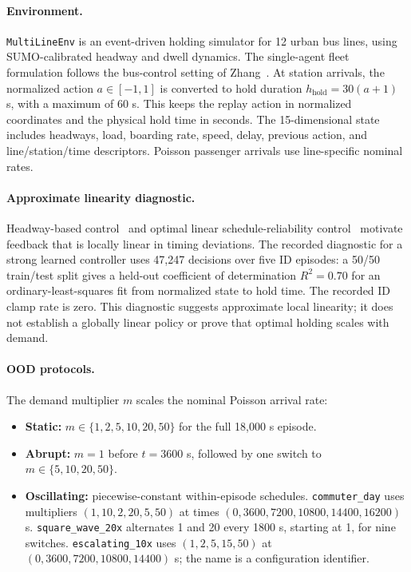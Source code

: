 \documentclass[10pt]{article}
\begin{document}
\paragraph{Environment.}
\texttt{MultiLineEnv} is an event-driven holding simulator for 12 urban bus lines, using SUMO-calibrated headway and dwell dynamics. The single-agent fleet formulation follows the bus-control setting of Zhang~\cite{Zhang2025SingleAgentBus}. At station arrivals, the normalized action $a\in[-1,1]$ is converted to hold duration $h_{\mathrm{hold}}=30(a+1)$ s, with a maximum of 60 s. This keeps the replay action in normalized coordinates and the physical hold time in seconds. The 15-dimensional state includes headways, load, boarding rate, speed, delay, previous action, and line/station/time descriptors. Poisson passenger arrivals use line-specific nominal rates.

\paragraph{Approximate linearity diagnostic.}
Headway-based control~\cite{daganzo2009headway} and optimal linear schedule-reliability control~\cite{xuan2011dynamic} motivate feedback that is locally linear in timing deviations. The recorded diagnostic for a strong learned controller uses 47,247 decisions over five ID episodes: a 50/50 train/test split gives a held-out coefficient of determination $R^2=0.70$ for an ordinary-least-squares fit from normalized state to hold time. The recorded ID clamp rate is zero. This diagnostic suggests approximate local linearity; it does not establish a globally linear policy or prove that optimal holding scales with demand.

\paragraph{OOD protocols.}
The demand multiplier $m$ scales the nominal Poisson arrival rate:
\begin{itemize}
    \item \textbf{Static:} $m\in\{1,2,5,10,20,50\}$ for the full 18,000 s episode.
    \item \textbf{Abrupt:} $m=1$ before $t=3600$ s, followed by one switch to $m\in\{5,10,20,50\}$.
    \item \textbf{Oscillating:} piecewise-constant within-episode schedules. \texttt{commuter\_day} uses multipliers $(1,10,2,20,5,50)$ at times $(0,3600,7200,10800,14400,16200)$ s. \texttt{square\_wave\_20x} alternates 1 and 20 every 1800 s, starting at 1, for nine switches. \texttt{escalating\_10x} uses $(1,2,5,15,50)$ at $(0,3600,7200,10800,14400)$ s; the name is a configuration identifier.
\end{itemize}
\end{document}

